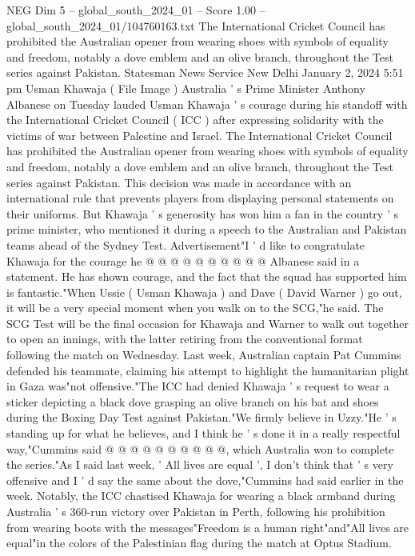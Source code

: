 \begin{textsample}{NEG Dim 5 – global\_south\_2024\_01 – Score 1.00 – global\_south\_2024\_01/104760163.txt}  \label{ex:f5_neg_448}
The International Cricket Council has prohibited the Australian opener from wearing shoes with symbols of equality and freedom, notably a dove emblem and an olive branch, throughout the Test series against Pakistan.
Statesman News Service New Delhi January 2, 2024 5:51 pm Usman Khawaja ( File Image ) Australia ' s Prime Minister Anthony Albanese on Tuesday lauded Usman Khawaja ' s courage during his standoff with the International Cricket Council ( ICC ) after expressing solidarity with the victims of war between Palestine and Israel.
The International Cricket Council has prohibited the Australian opener from wearing shoes with symbols of equality and freedom, notably a dove emblem and an olive branch, throughout the Test series against Pakistan.
This decision was made in accordance with an international rule that prevents players from displaying personal statements on their uniforms.
But Khawaja ' s generosity has won him a fan in the country ' s prime minister, who mentioned it during a speech to the Australian and Pakistan teams ahead of the Sydney Test.
Advertisement"I ' d like to congratulate Khawaja for the courage he @ @ @ @ @ @ @ @ @ @ Albanese said in a statement.
He has shown courage, and the fact that the squad has supported him is fantastic."When Ussie ( Usman Khawaja ) and Dave ( David Warner ) go out, it will be a very special moment when you walk on to the SCG,"he said.
The SCG Test will be the final occasion for Khawaja and Warner to walk out together to open an innings, with the latter retiring from the conventional format following the match on Wednesday.
Last week, Australian captain Pat Cummins defended his teammate, claiming his attempt to highlight the humanitarian plight in Gaza was"not offensive."The ICC had denied Khawaja ' s request to wear a sticker depicting a black dove grasping an olive branch on his bat and shoes during the Boxing Day Test against Pakistan."We firmly believe in Uzzy."He ' s standing up for what he believes, and I think he ' s done it in a really respectful way,"Cummins said @ @ @ @ @ @ @ @ @ @, which Australia won to complete the series."As I said last week, ' All lives are equal ', I don't think that ' s very offensive and I ' d say the same about the dove,"Cummins had said earlier in the week.
Notably, the ICC chastised Khawaja for wearing a black armband during Australia ' s 360-run victory over Pakistan in Perth, following his prohibition from wearing boots with the messages"Freedom is a human right"and"All lives are equal"in the colors of the Palestinian flag during the match at Optus Stadium.

\end{textsample}

